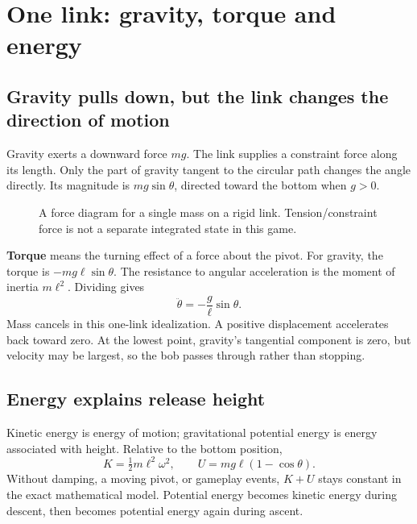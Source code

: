 \documentclass[11pt,a4paper]{article}
\begin{document}
\section{One link: gravity, torque and energy}
\subsection{Gravity pulls down, but the link changes the direction of motion}
Gravity exerts a downward force \(mg\). The link supplies a constraint force along its length. Only the part of gravity tangent to the circular path changes the angle directly. Its magnitude is \(mg\sin\theta\), directed toward the bottom when \(g>0\).
\begin{figure}[H]\centering
{}\caption{A force diagram for a single mass on a rigid link. Tension/constraint force is not a separate integrated state in this game.}
\end{figure}
\textbf{Torque} means the turning effect of a force about the pivot. For gravity, the torque is \(-mg\ell\sin\theta\). The resistance to angular acceleration is the moment of inertia \(m\ell^2\). Dividing gives
\begin{equation}\label{eq:single}\ddot\theta=-\frac{g}{\ell}\sin\theta.\end{equation}
Mass cancels in this one-link idealization. A positive displacement accelerates back toward zero. At the lowest point, gravity's tangential component is zero, but velocity may be largest, so the bob passes through rather than stopping.
\subsection{Energy explains release height}
Kinetic energy is energy of motion; gravitational potential energy is energy associated with height. Relative to the bottom position,
\[
 K=\tfrac12 m\ell^2\omega^2,\qquad U=mg\ell(1-\cos\theta).
\]
Without damping, a moving pivot, or gameplay events, \(K+U\) stays constant in the exact mathematical model. Potential energy becomes kinetic energy during descent, then becomes potential energy again during ascent.
\end{document}
